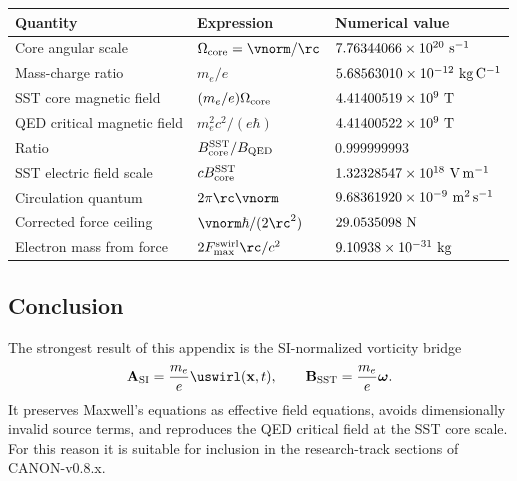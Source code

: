 \begin{center}
    \begin{tabular}{lll}
        \hline
        Quantity & Expression & Numerical value \\
        \hline
        Core angular scale &
        \(\Omega_{\rm core}=\vnorm/\rc\) &
        \(7.76344066\times10^{20}\ {\rm s^{-1}}\) \\
        
        Mass-charge ratio &
        \(m_e/e\) &
        \(5.68563010\times10^{-12}\ {\rm kg\,C^{-1}}\) \\
        
        SST core magnetic field &
        \((m_e/e)\Omega_{\rm core}\) &
        \(4.41400519\times10^9\ {\rm T}\) \\
        
        QED critical magnetic field &
        \(m_e^2c^2/(e\hbar)\) &
        \(4.41400522\times10^9\ {\rm T}\) \\
        
        Ratio &
        \(B_{\rm core}^{\rm SST}/B_{\rm QED}\) &
        \(0.999999993\) \\
        
        SST electric field scale &
        \(cB_{\rm core}^{\rm SST}\) &
        \(1.32328547\times10^{18}\ {\rm V\,m^{-1}}\) \\
        
        Circulation quantum &
        \(2\pi\rc\vnorm\) &
        \(9.68361920\times10^{-9}\ {\rm m^2\,s^{-1}}\) \\
        
        Corrected force ceiling &
        \(\vnorm\hbar/(2\rc^2)\) &
        \(29.0535098\ {\rm N}\) \\
        
        Electron mass from force &
        \(2F_{\max}^{\rm swirl}\rc/c^2\) &
        \(9.10938\times10^{-31}\ {\rm kg}\) \\
        \hline
    \end{tabular}
\end{center}

\subsection{Conclusion}

The strongest result of this appendix is the SI-normalized vorticity
bridge
\[
    \mathbf{A}_{\rm SI}
    =
    \frac{m_e}{e}\uswirl(\mathbf{x},t),
    \qquad
    \mathbf{B}_{\rm SST}
    =
    \frac{m_e}{e}\boldsymbol{\omega}.
\]
It preserves Maxwell's equations as effective field equations, avoids
dimensionally invalid source terms, and reproduces the QED critical field
at the SST core scale.  For this reason it is suitable for inclusion in
the research-track sections of CANON-v0.8.x.

